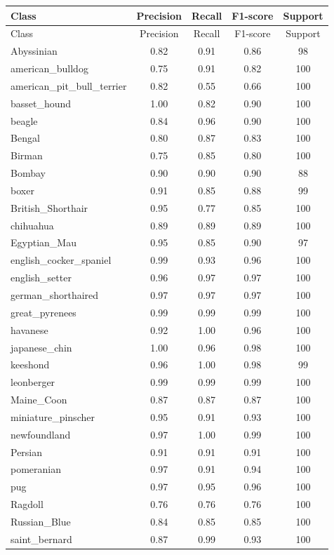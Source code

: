 \documentclass[10pt]{article}
\begin{document}
\begin{longtable}{|l|c|c|c|c|}
\hline
Class & Precision & Recall & F1-score & Support\\
\hline
\endfirsthead
\hline
Class & Precision & Recall & F1-score & Support\\
\hline
\endhead
Abyssinian & 0.82 & 0.91 & 0.86 & 98\\
american\_bulldog & 0.75 & 0.91 & 0.82 & 100\\
american\_pit\_bull\_terrier & 0.82 & 0.55 & 0.66 & 100\\
basset\_hound & 1.00 & 0.82 & 0.90 & 100\\
beagle & 0.84 & 0.96 & 0.90 & 100\\
Bengal & 0.80 & 0.87 & 0.83 & 100\\
Birman & 0.75 & 0.85 & 0.80 & 100\\
Bombay & 0.90 & 0.90 & 0.90 & 88\\
boxer & 0.91 & 0.85 & 0.88 & 99\\
British\_Shorthair & 0.95 & 0.77 & 0.85 & 100\\
chihuahua & 0.89 & 0.89 & 0.89 & 100\\
Egyptian\_Mau & 0.95 & 0.85 & 0.90 & 97\\
english\_cocker\_spaniel & 0.99 & 0.93 & 0.96 & 100\\
english\_setter & 0.96 & 0.97 & 0.97 & 100\\
german\_shorthaired & 0.97 & 0.97 & 0.97 & 100\\
great\_pyrenees & 0.99 & 0.99 & 0.99 & 100\\
havanese & 0.92 & 1.00 & 0.96 & 100\\
japanese\_chin & 1.00 & 0.96 & 0.98 & 100\\
keeshond & 0.96 & 1.00 & 0.98 & 99\\
leonberger & 0.99 & 0.99 & 0.99 & 100\\
Maine\_Coon & 0.87 & 0.87 & 0.87 & 100\\
miniature\_pinscher & 0.95 & 0.91 & 0.93 & 100\\
newfoundland & 0.97 & 1.00 & 0.99 & 100\\
Persian & 0.91 & 0.91 & 0.91 & 100\\
pomeranian & 0.97 & 0.91 & 0.94 & 100\\
pug & 0.97 & 0.95 & 0.96 & 100\\
Ragdoll & 0.76 & 0.76 & 0.76 & 100\\
Russian\_Blue & 0.84 & 0.85 & 0.85 & 100\\
saint\_bernard & 0.87 & 0.99 & 0.93 & 100\\

\end{longtable}
\end{document}
